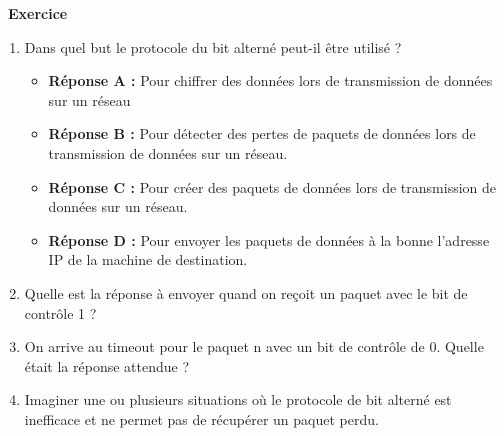 \documentclass[
  11pt,
]{article}
\providecommand{\tightlist}{%
  \setlength{\itemsep}{0pt}\setlength{\parskip}{0pt}}
\newcounter{exo}
\newenvironment{exercice}[1]
{\par \medskip   \addtocounter{exo}{1} \noindent  
\begin{bclogo}[arrondi =0.1,   noborder = true, logo=\bccrayon, marge=4]{~\textbf{Exercice} \textbf{\theexo} {\itshape #1} }  \par}
{
\end{bclogo}
 \par \bigskip }
\newcounter{def}
\begin{document}
\begin{exercice}{}

\begin{enumerate}
\def\labelenumi{\arabic{enumi}.}
\item
  Dans quel but le protocole du bit alterné peut-il être utilisé ?

  \begin{itemize}
  \tightlist
  \item
    \textbf{Réponse A :} Pour chiffrer des données lors de transmission
    de données sur un réseau
  \item
    \textbf{Réponse B :} Pour détecter des pertes de paquets de données
    lors de transmission de données sur un réseau.
  \item
    \textbf{Réponse C :} Pour créer des paquets de données lors de
    transmission de données sur un réseau.
  \item
    \textbf{Réponse D :} Pour envoyer les paquets de données à la bonne
    l'adresse IP de la machine de destination.
  \end{itemize}
\item
  Quelle est la réponse à envoyer quand on reçoit un paquet avec le bit
  de contrôle 1 ?
\item
  On arrive au timeout pour le paquet n avec un bit de contrôle de 0.
  Quelle était la réponse attendue ?
\item
  Imaginer une ou plusieurs situations où le protocole de bit alterné
  est inefficace et ne permet pas de récupérer un paquet perdu.
\end{enumerate}

\end{exercice}
\end{document}
